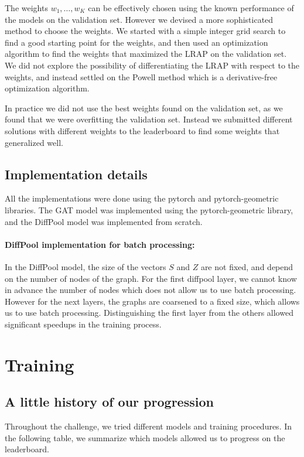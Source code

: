 \documentclass[switch, 11pt]{article}
\begin{document}
\begin{multicols}{2}
    The weights $w_1,\dots,w_K$ can be effectively chosen using the known performance of the models on the validation set. However we devised a more sophisticated method to choose the weights. We started with a simple integer grid search to find a good starting point for the weights, and then used an optimization algorithm to find the weights that maximized the LRAP on the validation set. We did not explore the possibility of differentiating the LRAP with respect to the weights, and instead settled on the Powell method \cite{powell-1964} which is a derivative-free optimization algorithm.

    In practice we did not use the best weights found on the validation set, as we found that we were overfitting the validation set. Instead we submitted different solutions with different weights to the leaderboard to find some weights that generalized well.

    \subsection{Implementation details}

    All the implementations were done using the pytorch and pytorch-geometric libraries. The GAT model was implemented using the pytorch-geometric library, and the DiffPool model was implemented from scratch.

    \paragraph*{DiffPool implementation for batch processing:} In the DiffPool model, the size of the vectors $S$ and $Z$ are not fixed, and depend on the number of nodes of the graph. For the first diffpool layer, we cannot know in advance the number of nodes which does not allow us to use batch processing. However for the next layers, the graphs are coarsened to a fixed size, which allows us to use batch processing. Distinguishing the first layer from the others allowed significant speedups in the training process.

    \section{Training}

    \subsection{A little history of our progression}
    Throughout the challenge, we tried different models and training procedures. In the following table, we summarize which models allowed us to progress on the leaderboard.


\end{multicols}
\end{document}
